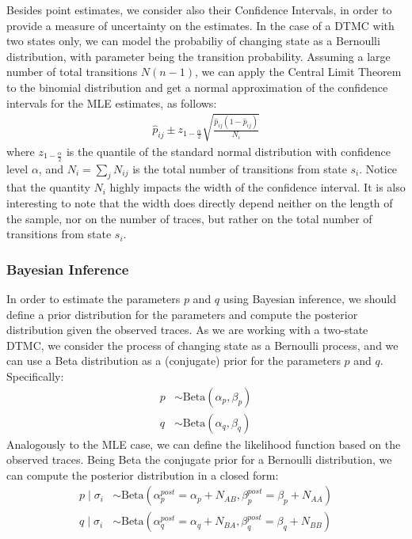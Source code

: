 \documentclass[twocolumn, 9pt]{extarticle}
\begin{document}

Besides point estimates, we consider also their Confidence Intervals, in order to provide a measure of uncertainty on the estimates.
In the case of a DTMC with two states only, we can model the probabiliy of changing state as a Bernoulli distribution, with parameter being the transition probability.
Assuming a large number of total transitions $N(n-1)$, we can apply the Central Limit Theorem to the binomial distribution and get a normal approximation of the confidence intervals for the MLE estimates, as follows:
\begin{align*}
    \hat p_{ij} \pm z_{1-\frac{\alpha}{2}} \sqrt{\frac{\hat p_{ij} (1 - \hat p_{ij})}{N_i}}
\end{align*}
where $z_{1-\frac{\alpha}{2}}$ is the quantile of the standard normal distribution with confidence level $\alpha$, and $N_i = \sum_j N_{ij}$ is the total number of 
transitions from state $s_i$. Notice that the quantity $N_i$ highly impacts the width of the confidence interval. It is also interesting to note that
the width does directly depend neither on the length of the sample, nor on the number of traces, but rather on the total number of transitions from state $s_i$.

\subsubsection{Bayesian Inference}
In order to estimate the parameters $p$ and $q$ using Bayesian inference, we should define a prior distribution for the parameters and compute the posterior distribution given the observed traces.
As we are working with a two-state DTMC, we consider the process of changing state as a Bernoulli process, and we can use a Beta distribution as a (conjugate) prior for the parameters $p$ and $q$.
Specifically:
\begin{align*}
    p &\sim \text{Beta}(\alpha_p, \beta_p) \\
    q &\sim \text{Beta}(\alpha_q, \beta_q)
\end{align*}
Analogously to the MLE case, we can define the likelihood function based on the observed traces. Being Beta the conjugate prior for a Bernoulli distribution, we can compute the posterior distribution in a closed form:
\begin{align*}
    p \mid \sigma_i &\sim \text{Beta}(\alpha^{post}_{p}= \alpha_p + N_{AB}, \beta^{post}_{p}=\beta_p + N_{AA}) \\
    q \mid \sigma_i &\sim \text{Beta}(\alpha^{post}_{q}=\alpha_q + N_{BA}, \beta^{post}_{q}=\beta_q + N_{BB})
\end{align*}
\end{document}
